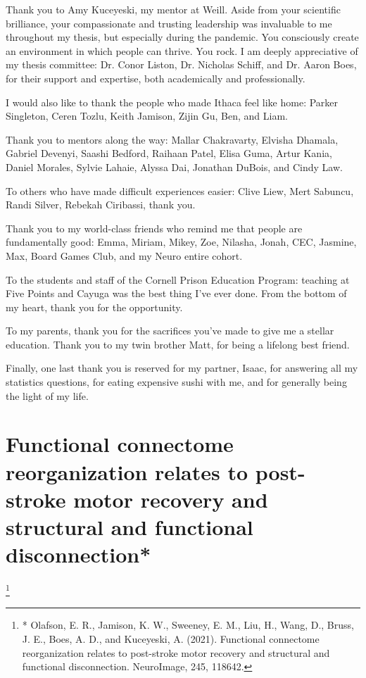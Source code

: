 \documentclass[phd,tocprelim]{cornell}
\newcommand\blfootnote[1]{%
  \begingroup
  \renewcommand\thefootnote{}\footnote{#1}%
  \addtocounter{footnote}{-1}%
  \endgroup
}
\begin{document}
\begin{acknowledgements}
Thank you to Amy Kuceyeski, my mentor at Weill. Aside from your  scientific brilliance, your compassionate and trusting leadership was invaluable to me throughout my thesis, but especially during the pandemic.  You consciously create an environment in which people can  thrive. You rock. I am deeply appreciative of my thesis committee: Dr. Conor Liston, Dr. Nicholas Schiff, and Dr. Aaron Boes, for their support and expertise, both academically and professionally.

I would also like to thank the people who made Ithaca feel like home:  Parker Singleton, Ceren Tozlu, Keith Jamison, Zijin Gu, Ben, and Liam.

Thank you to mentors along the way: Mallar Chakravarty, Elvisha Dhamala, Gabriel Devenyi, Saashi Bedford, Raihaan Patel,  Elisa Guma, Artur Kania,  Daniel Morales, Sylvie Lahaie, Alyssa Dai,  Jonathan DuBois,  and Cindy Law.

To others who have made difficult experiences easier: Clive Liew, Mert Sabuncu, Randi Silver, Rebekah Ciribassi, thank you.

Thank you to my world-class friends who remind me that people are fundamentally good: Emma, Miriam, Mikey, Zoe, Nilasha, Jonah, CEC, Jasmine, Max, Board Games Club, and my Neuro entire cohort.

To the students and staff of the Cornell Prison Education Program: teaching at Five Points and Cayuga was the best thing I've ever done. From the bottom of my heart, thank you for the opportunity.

To my parents, thank you for the sacrifices you’ve made to
give me a stellar education. Thank you to my twin brother Matt, for being a lifelong best friend.

Finally, one last thank you is reserved for my partner, Isaac,  for answering all my statistics questions, for eating expensive sushi with me, and for generally being the light of my life.
\end{acknowledgements}

\contentspage
\tablelistpage
\figurelistpage

\normalspacing \setcounter{page}{1} 
\pagestyle{cornell} \addtolength{\parskip}{0.5\baselineskip}

\chapter{Functional connectome reorganization relates to post-stroke motor recovery and structural and functional disconnection*}
\blfootnote{* Olafson, E. R., Jamison, K. W., Sweeney, E. M., Liu, H., Wang, D., Bruss, J. E., Boes, A. D., and Kuceyeski, A. (2021). Functional connectome reorganization relates to post-stroke motor recovery and structural and functional disconnection. NeuroImage, 245, 118642.}
\end{document}

